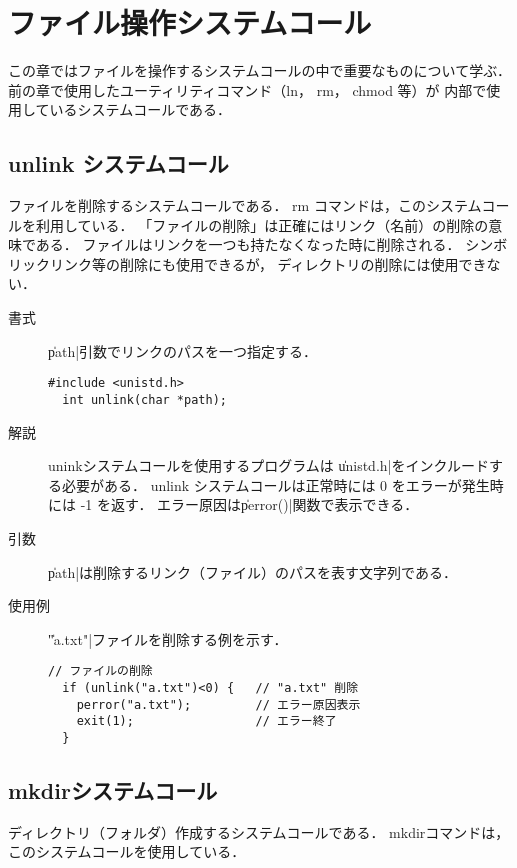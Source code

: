 \chapter{ファイル操作システムコール}

この章ではファイルを操作するシステムコールの中で重要なものについて学ぶ．
前の章で使用したユーティリティコマンド（ln， rm， chmod 等）が
内部で使用しているシステムコールである．

\section{unlink システムコール}
ファイルを削除するシステムコールである．
rm コマンドは，このシステムコールを利用している．
「ファイルの削除」は正確にはリンク（名前）の削除の意味である．
ファイルはリンクを一つも持たなくなった時に削除される．
シンボリックリンク等の削除にも使用できるが，
ディレクトリの削除には使用できない．

\begin{description}
\item[書式] \|path|引数でリンクのパスを一つ指定する．
\begin{lstlisting}[numbers=none]
  #include <unistd.h>
  int unlink(char *path);
\end{lstlisting}

\item[解説] uninkシステムコールを使用するプログラムは
\|unistd.h|をインクルードする必要がある．
unlink システムコールは正常時には 0 をエラーが発生時には -1 を返す．
エラー原因は\|perror()|関数で表示できる．

\item[引数] \|path|は削除するリンク（ファイル）のパスを表す文字列である．

\item[使用例] \|"a.txt"|ファイルを削除する例を示す．
\begin{lstlisting}[numbers=none]
  // ファイルの削除
  if (unlink("a.txt")<0) {   // "a.txt" 削除
    perror("a.txt");         // エラー原因表示
    exit(1);                 // エラー終了
  }
\end{lstlisting}
\end{description}

\section{mkdirシステムコール}
ディレクトリ（フォルダ）作成するシステムコールである．
mkdirコマンドは，このシステムコールを使用している．

